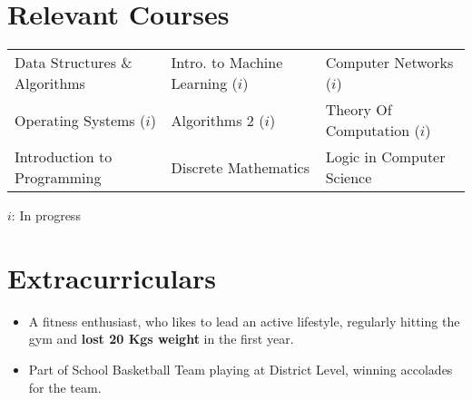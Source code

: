 \documentclass[letterpaper,10pt]{article}
\newcommand{\resumeSubHeadingListStart}{\begin{itemize}[leftmargin=*]}
\newcommand{\resumeSubHeadingListEnd}{\end{itemize}}
\begin{document}
\section{Relevant Courses}
{\fontsize{10pt}{1em}\bodyfontlight\upshape\color{black}
	\begin{tabular*}{\textwidth}{l l l}
		Data Structures \& Algorithms 
		& \hspace{6em} Intro. to Machine Learning ($i$) 
		& \hspace{6em} Computer Networks ($i$)
		\\
		Operating Systems ($i$)
		&\hspace{6em} Algorithms 2 ($i$)
		&\hspace{6em} Theory Of Computation ($i$)
		\\
		Introduction to Programming &\hspace{6em} 
		Discrete Mathematics   &\hspace{6em} 
		Logic in Computer Science  \vspace{0pt}
	\end{tabular*}
}
\hspace*{\fill} 
		$i$: In progress\\

\vspace{-0.6cm}
\section{Extracurriculars}
\begin{itemize}[noitemsep]
	  \item \fontsize{10pt}{1em}A fitness enthusiast, who likes to lead an active lifestyle, regularly hitting the gym and \textbf{lost 20 Kgs weight} in the first year. 
	  \item Part of School Basketball Team playing at District Level, winning accolades for the team.
\end{itemize}

%


\end{document}
